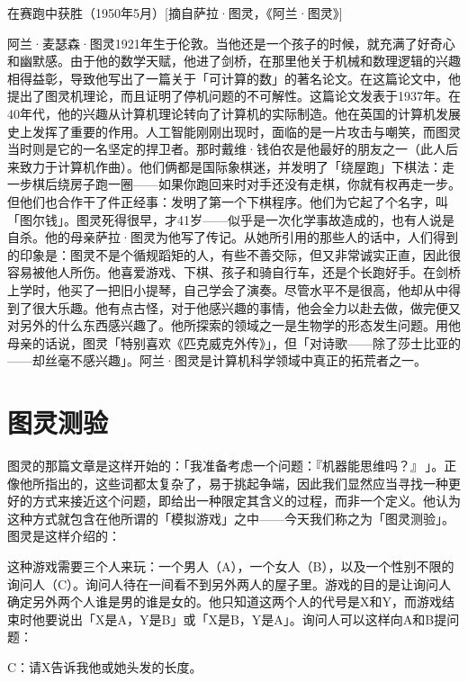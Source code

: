 \documentclass[
  12pt,
  twoside,
  openright,
  oldfontcommands,
]{memoir}
\newenvironment{fsquote}{%
  \begin{mdframed}[style=gebquote]\kaitifamily\small%
}{%
  \end{mdframed}%
}
\begin{document}
在赛跑中获胜（1950年5月）{[}摘自萨拉·图灵，《阿兰·图灵》{]}

阿兰·麦瑟森·图灵1921年生于伦敦。当他还是一个孩子的时候，就充满了好奇心和幽默感。由于他的数学天赋，他进了剑桥，在那里他关于机械和数理逻辑的兴趣相得益彰，导致他写出了一篇关于「可计算的数」的著名论文。在这篇论文中，他提出了图灵机理论，而且证明了停机问题的不可解性。这篇论文发表于1937年。在40年代，他的兴趣从计算机理论转向了计算机的实际制造。他在英国的计算机发展史上发挥了重要的作用。人工智能刚刚出现时，面临的是一片攻击与嘲笑，而图灵当时则是它的一名坚定的捍卫者。那时戴维·钱伯农是他最好的朋友之一（此人后来致力于计算机作曲）。他们俩都是国际象棋迷，并发明了「绕屋跑」下棋法：走一步棋后绕房子跑一圈------如果你跑回来时对手还没有走棋，你就有权再走一步。但他们也合作干了件正经事：发明了第一个下棋程序。他们为它起了个名字，叫「图尔钱」。图灵死得很早，才41岁------似乎是一次化学事故造成的，也有人说是自杀。他的母亲萨拉·图灵为他写了传记。从她所引用的那些人的话中，人们得到的印象是：图灵不是个循规蹈矩的人，有些不善交际，但又非常诚实正直，因此很容易被他人所伤。他喜爱游戏、下棋、孩子和骑自行车，还是个长跑好手。在剑桥上学时，他买了一把旧小提琴，自己学会了演奏。尽管水平不是很高，他却从中得到了很大乐趣。他有点古怪，对于他感兴趣的事情，他会全力以赴去做，做完便又对另外的什么东西感兴趣了。他所探索的领域之一是生物学的形态发生问题。用他母亲的话说，图灵「特别喜欢《匹克威克外传》」，但「对诗歌------除了莎士比亚的------却丝毫不感兴趣」。阿兰·图灵是计算机科学领域中真正的拓荒者之一。

\section{图灵测验}

图灵的那篇文章是这样开始的：「我准备考虑一个问题：『机器能思维吗？』\,」。正像他所指出的，这些词都太复杂了，易于挑起争端，因此我们显然应当寻找一种更好的方式来接近这个问题，即给出一种限定其含义的过程，而非一个定义。他认为这种方式就包含在他所谓的「模拟游戏」之中------今天我们称之为「图灵测验」。图灵是这样介绍的：

\begin{fsquote}
这种游戏需要三个人来玩：一个男人（A），一个女人（B），以及一个性别不限的询问人（C）。询问人待在一间看不到另外两人的屋子里。游戏的目的是让询问人确定另外两个人谁是男的谁是女的。他只知道这两个人的代号是X和Y，而游戏结束时他要说出「X是A，Y是B」或「X是B，Y是A」。询问人可以这样向A和B提问题：
\end{fsquote}

\begin{fsquote}
C：请X告诉我他或她头发的长度。
\end{fsquote}
\end{document}
